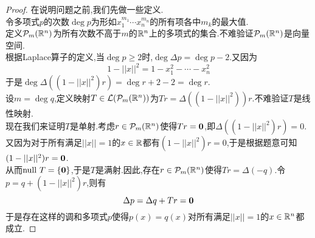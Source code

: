 \documentclass{ctexart}
\begin{document}
\begin{proof}
    在说明问题之前,我们先做一些定义.\\
    令多项式$p$的次数$\deg p$为形如$x_1^{m_1}\cdots x_n^{m_n}$的所有项各中$m_k$的最大值.\\
    定义$\mathcal{P}_m(\mathbb{R}^n)$为所有次数不高于$m$的$\mathbb{R}^n$上的多项式的集合.不难验证$\mathcal{P}_m(\mathbb{R}^n)$是向量空间.\\
    根据Laplace算子的定义,当$\deg p\geqslant 2$时,$\deg\Delta p=\deg p-2$.又因为
    \[1-||x||^2=1-x_1^2-\cdots-x_n^2\]
    于是$\deg\Delta\left(\left(1-||x||^2\right)r\right)=\deg r+2-2=\deg r$.\\
    设$m=\deg q$,定义映射$T\in\mathcal{L}(\mathcal{P}_m(\mathbb{R}^n))$为$Tr=\Delta\left(\left(1-||x||^2\right)\right)r$.不难验证$T$是线性映射.\\
    现在我们来证明$T$是单射.考虑$r\in\mathcal{P}_m(\mathbb{R}^n)$使得$Tr=\mathbf0$,即$\Delta\left(\left(1-||x||^2\right)r\right)=0$.\\
    又因为对于所有满足$||x||=1$的$x\in\mathbb{R}$都有$\left(1-||x||^2\right)r=0$,于是根据题意可知$(1-||x||^2)r=\mathbf0$.\\
    从而$\text{null } T=\{\mathbf0\}$,于是$T$是满射.因此,存在$r\in\mathcal{P}_m(\mathbb{R}^n)$使得$Tr=\Delta(-q)$.令$p=q+\left(1-||x||^2\right)r$,则有
    \[\Delta p=\Delta q+Tr=\mathbf0\]
    于是存在这样的调和多项式$p$使得$p(x)=q(x)$对所有满足$||x||=1$的$x\in\mathbb{R}^n$都成立.
\end{proof}
\end{document}
